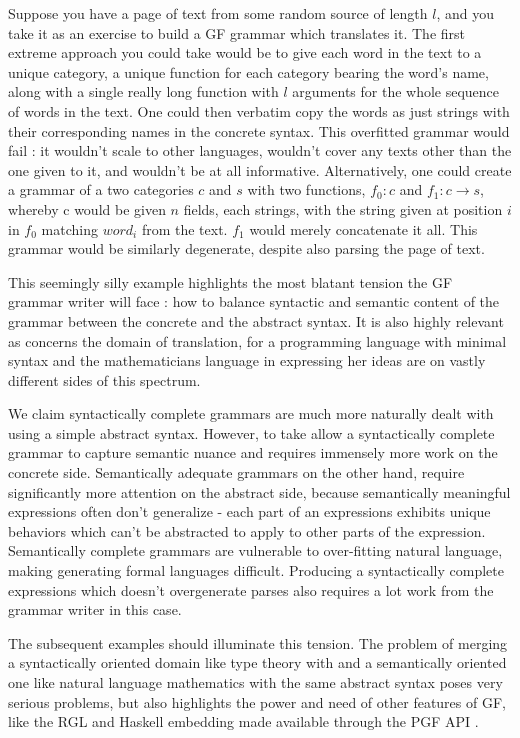 Suppose you have a page of text from some random source of length $l$, and you
take it as an exercise to build a GF grammar which translates it. The first
extreme approach you could take would be to give each word in the text to a
unique category, a unique function for each category bearing the word's name,
along with a single really long function with $l$ arguments for the whole sequence of
words in the text. One could then verbatim copy the words as just strings with
their corresponding names in the concrete syntax. This overfitted grammar would
fail : it wouldn't scale to other languages, wouldn't cover any texts other than
the one given to it, and wouldn't be at all informative. Alternatively, one
could create a grammar of a two categories $c$ and $s$ with two functions, $f_0
: c$ and $f_1 : c \rightarrow s$, whereby c would be given $n$ fields, each
strings, with the string given at position $i$ in $f_0$ matching $word_i$ from
the text. $f_1$ would merely concatenate it all. This grammar would be similarly
degenerate, despite also parsing the page of text.

This seemingly silly example highlights the most blatant tension the GF grammar
writer will face : how to balance syntactic and semantic content of the grammar
between the concrete and the abstract syntax. It is also highly
relevant as concerns the domain of translation, for a programming language
with minimal syntax and the mathematicians language in expressing her ideas are
on vastly different sides of this spectrum.

We claim syntactically complete grammars are much more naturally dealt with
using a simple abstract syntax. However, to take allow a syntactically complete
grammar to capture semantic nuance and requires immensely more work on the
concrete side. Semantically adequate grammars on the other hand, require
significantly more attention on the abstract side, because semantically
meaningful expressions often don't generalize - each part of an expressions
exhibits unique behaviors which can't be abstracted to apply to other parts of
the expression. Semantically complete grammars are vulnerable to over-fitting
natural language, making generating formal languages difficult. Producing a
syntactically complete expressions which doesn't overgenerate parses also
requires a lot work from the grammar writer in this case.

The subsequent examples should illuminate this tension. The problem of
merging a syntactically oriented domain like type theory with and a semantically
oriented one like natural language mathematics with the same abstract syntax poses very serious
problems, but also highlights the power and need of other features of GF, like the RGL \cite{ranta2009rgl}
and Haskell embedding made available through the PGF API \cite{angelovApi}.

